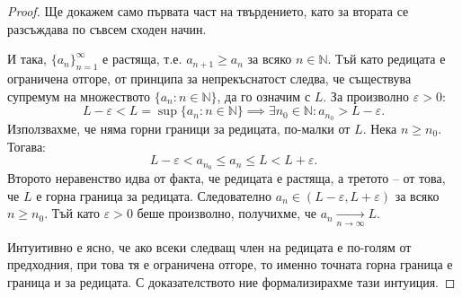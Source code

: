 \begin{proof}
Ще докажем само първата част на твърдението, като за втората се разсъждава по съвсем сходен начин.

И така, $\{a_n\}_{n=1}^{\infty}$ е растяща, т.е. $a_{n+1} \ge a_n$ за всяко $n \in \mathbb{N}$. Тъй като редицата е ограничена отгоре, от принципа за непрекъснатост следва, че съществува супремум на множеството $\{a_n : n \in \mathbb{N}\}$, да го означим с $L$. За произволно $\varepsilon > 0$:
\[
L - \varepsilon < L = \sup \{a_n : n \in \mathbb{N}\} \implies \exists n_0 \in \mathbb{N} : a_{n_0} > L - \varepsilon.
\]
Използвахме, че няма горни граници за редицата, по-малки от $L$. Нека $n \ge n_0$. Тогава:
\[
L - \varepsilon < a_{n_0} \le a_n \le L < L + \varepsilon.
\]
Второто неравенство идва от факта, че редицата е растяща, а третото -- от това, че $L$ е горна граница за редицата. Следователно $a_n \in (L - \varepsilon, L + \varepsilon)$ за всяко $n \ge n_0$. Тъй като $\varepsilon > 0$ беше произволно, получихме, че $a_n \xrightarrow[n\to\infty]{} L$.

Интуитивно е ясно, че ако всеки следващ член на редицата е по-голям от предходния, при това тя е ограничена отгоре, то именно точната горна граница е граница и за редицата. С доказателството ние формализирахме тази интуиция.
\end{proof}

